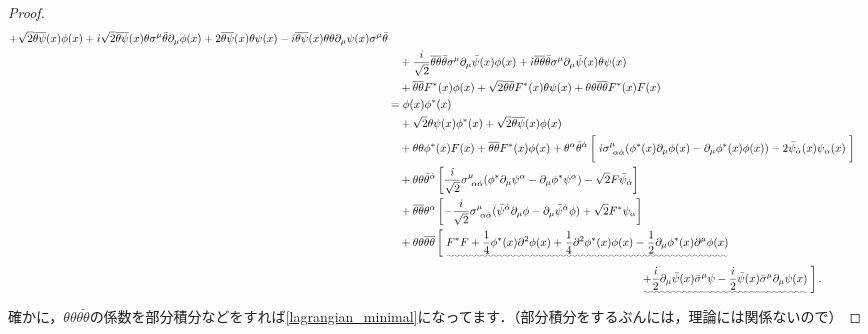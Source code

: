 \documentclass[a4paper,uplatex,dvipdfmx]{jsarticle}
\theoremstyle{definition}
\begin{document}
\begin{proof}
\begin{align}
    +
    \sqrt{2}\overline{\theta\psi}(x)\phi(x)
    +
    i\sqrt{2}\overline{\theta\psi}(x)\theta\sigma^{\mu}\bar{\theta}\partial_{\mu}\phi(x)
    +
    2\overline{\theta\psi}(x)\theta\psi(x)
    -
    i\overline{\theta\psi}(x)
    \theta\theta\partial_{\mu}\psi(x)\sigma^{\mu}\bar{\theta}
    \nonumber
    \\
    &\quad
    +
    \frac{i}{\sqrt{2}}\overline{\theta\theta}\bar{\theta}\sigma^{\mu}\partial_{\mu}\bar{\psi}(x)
    \phi(x)
    +
    i\overline{\theta\theta}\bar{\theta}\sigma^{\mu}\partial_{\mu}\bar{\psi}(x)
    \theta\psi(x)
    \nonumber
    \\
    &\quad
    +
    \overline{\theta\theta}F^{*}(x)
    \phi(x)
    +  
    \sqrt{2}  
    \overline{\theta\theta}F^{*}(x)
    \theta\psi(x)
    +
    \theta\theta\overline{\theta\theta}F^{*}(x)F(x)
    \nonumber
    \\
    &=
    \phi(x)\phi^{*}(x)
    \nonumber
    \\
    &\quad
    +
    \sqrt{2}\theta\psi(x)\phi^{*}(x)
    +
    \sqrt{2}\overline{\theta\psi}(x)\phi(x)
    \nonumber
    \\
    &\quad
    +
    \theta\theta
    \phi^{*}(x)F(x)
    +
    \overline{\theta\theta}F^{*}(x)\phi(x)
    +
    \theta^{\alpha}\bar{\theta}^{\dot{\alpha}}
    \left[ \vphantom{\dfrac{1}{2}} \right.
      i\sigma^{\mu}_{\ \alpha\dot{\alpha}}(\phi^{*}(x)\partial_{\mu}\phi(x)-\partial_{\mu}\phi^{*}(x)\phi(x))
      -2\bar{\psi}_{\dot{\alpha}}(x)\psi_{\alpha}(x)
    \left. \vphantom{\dfrac{1}{2}} \right]
    \nonumber
    \\
    &\quad
    +
    \theta\theta\bar{\theta}^{\dot{\alpha}}
    \left[  
      \frac{i}{\sqrt{2}}\sigma^{\mu}_{\ \alpha\dot{\alpha}}
      (\phi^{*}\partial_{\mu}\psi^{\alpha}-\partial_{\mu}\phi^{*}\psi^{\alpha})
      -
      \sqrt{2}F\bar{\psi}_{\dot{\alpha}}
    \right]
    \nonumber
    \\
    &\quad
    +
    \overline{\theta\theta}\theta^{\alpha}
    \left[  
      -
      \frac{i}{\sqrt{2}}\sigma^{\mu}_{\ \alpha\dot{\alpha}}(\bar{\psi}^{\dot{\alpha}}\partial_{\mu}\phi-\partial_{\mu}\bar{\psi}^{\dot{\alpha}}\phi)
      +
      \sqrt{2}F^{*}\psi_{\alpha}
    \right]
    \nonumber
    \\
    &\quad
    +
    \theta\theta\overline{\theta\theta}
    \left[ \vphantom{\dfrac{1}{2}} \right.
      \uwave{F^{*}F
      +
      \frac{1}{4}\phi^{*}(x)\partial^2\phi(x)
      +
      \frac{1}{4}\partial^2\phi^{*}(x)\phi(x)
      -
      \frac{1}{2}\partial_{\mu}\phi^{*}(x)\partial^{\mu}\phi(x)}
    \nonumber
    \\
    &\hspace{8cm}
      \uwave{+
      \frac{i}{2}\partial_{\mu}\bar{\psi}(x)\bar{\sigma}^{\mu}\psi
      -
      \frac{i}{2}\bar{\psi}(x)\bar{\sigma}^{\mu}\partial_{\mu}\psi(x)}
    \left. \vphantom{\dfrac{1}{2}} \right]
    .
    \end{align}
    確かに，$\theta\theta\bar{\theta\theta}$の係数を部分積分などをすれば\eqref{lagrangian_minimal}になってます．（部分積分をするぶんには，理論には関係ないので）
\end{proof}
\end{document}
